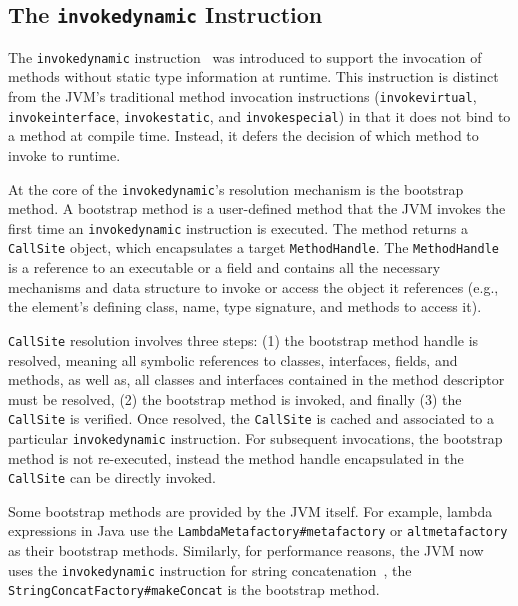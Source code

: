 

\subsection{The \texttt{invokedynamic} Instruction}
The \verb|invokedynamic| instruction~\cite{noauthor_java_nodate} was introduced to support the invocation of methods without static type information at runtime.
This instruction is distinct from the JVM's traditional method invocation instructions (\verb|invokevirtual|, \verb|invokeinterface|, \verb|invokestatic|, and \verb|invokespecial|) in that it does not bind to a method at compile time. Instead, it defers the decision of which method to invoke to runtime.

At the core of the \verb|invokedynamic|'s resolution mechanism is the bootstrap method. A bootstrap method is a user-defined method that the JVM invokes the first time an \verb|invokedynamic| instruction is executed. 
The method returns a \verb|CallSite| object, which encapsulates a target \verb|MethodHandle|. The \verb|MethodHandle| is a reference to an executable or a field and contains all the necessary mechanisms and data structure to invoke or access the object it references (e.g., the element's defining class, name, type signature, and methods to access it). 

\verb|CallSite| resolution involves three steps: (1) the bootstrap method handle is resolved, meaning all symbolic references to classes, interfaces, fields, and methods, as well as, all classes and interfaces contained in the method descriptor must be resolved, (2) the bootstrap method is invoked, and finally (3) the \verb|CallSite| is verified.
Once resolved, the \verb|CallSite| is cached and associated to a particular \verb|invokedynamic| instruction.
For subsequent invocations, the bootstrap method is not re-executed, instead the method handle encapsulated in the \verb|CallSite| can be directly invoked.

Some bootstrap methods are provided by the JVM itself. For example, lambda expressions in Java use the \verb|LambdaMetafactory#metafactory| or \verb|altmetafactory| as their bootstrap methods. Similarly, for performance reasons, the JVM now uses the \verb|invokedynamic| instruction for string concatenation~\cite{noauthor_jep_nodate-1}, the \verb|StringConcatFactory#makeConcat| is the bootstrap method.

